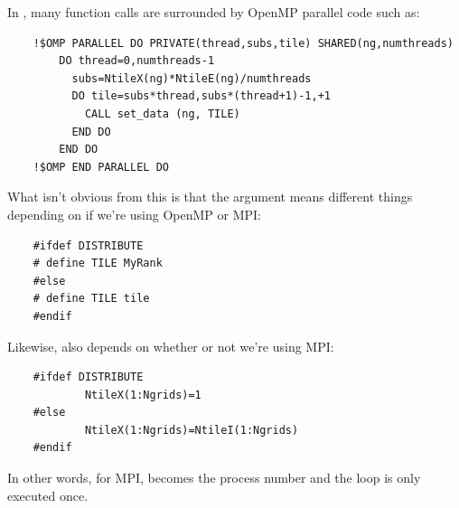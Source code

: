 In , many function calls are surrounded by
OpenMP parallel code such as:
\begin{verbatim}
    !$OMP PARALLEL DO PRIVATE(thread,subs,tile) SHARED(ng,numthreads)
        DO thread=0,numthreads-1
          subs=NtileX(ng)*NtileE(ng)/numthreads
          DO tile=subs*thread,subs*(thread+1)-1,+1
            CALL set_data (ng, TILE)
          END DO
        END DO
    !$OMP END PARALLEL DO 
\end{verbatim}
What isn't obvious from this is that the argument  means
different things depending on if we're using OpenMP or MPI:
\begin{verbatim}
    #ifdef DISTRIBUTE
    # define TILE MyRank
    #else
    # define TILE tile
    #endif
\end{verbatim}
Likewise,  also depends on whether or not we're using MPI:
\begin{verbatim}
    #ifdef DISTRIBUTE
            NtileX(1:Ngrids)=1
    #else
            NtileX(1:Ngrids)=NtileI(1:Ngrids)
    #endif
\end{verbatim}
In other words, for MPI,  becomes the process number and
the loop is only executed once.

